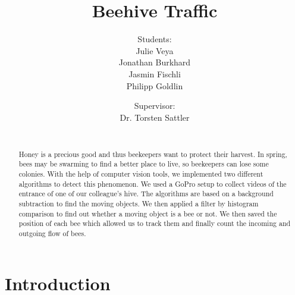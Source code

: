 \documentclass[10pt,twocolumn,letterpaper]{article}
\begin{document}
\title{Beehive Traffic}

\author{Students:\\
Julie Veya\\
Jonathan Burkhard\\
Jasmin Fischli\\
Philipp Goldlin\\
{}
\and
Supervisor:\\
Dr. Torsten Sattler\\
\\
{}
}

\maketitle


\begin{abstract}

   Honey is a precious good and thus beekeepers want to protect their harvest. In spring, bees may be swarming to find a better place to live, so beekeepers can lose some colonies. With the help of computer vision tools, we implemented two different algorithms to detect this phenomenon. We used a GoPro setup to collect videos of the entrance of one of our colleague's hive. The algorithms are based on a background subtraction to find the moving objects. We then applied a filter by histogram comparison to find out whether a moving object is a bee or not. We then saved the position of each bee which allowed us to track them and finally count the incoming and outgoing flow of bees.
   
\end{abstract}


\section{Introduction}
\end{document}
